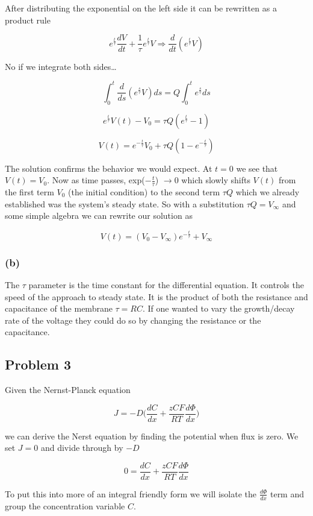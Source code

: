\documentclass[letterpaper,10pt,english]{/usr/share/sphinx/texinputs/sphinxhowto}
\begin{document}
After distributing the exponential on the left side it can be rewritten
as a product rule

\[e^{\frac{t}{\tau}}\frac{dV}{dt}+\frac{1}{\tau}e^{\frac{t}{\tau}}V \Rightarrow \frac{d}{dt}(e^{\frac{t}{\tau}}V)\]

No if we integrate both sides\ldots{}

\[\int_0^t \frac{d}{ds}(e^{\frac{s}{\tau}}V) ds = Q \int_0^t e^{\frac{s}{\tau}}ds\]

\[e^{\frac{t}{\tau}}V(t)-V_0 = \tau Q (e^{\frac{t}{\tau}}-1)\]

\[V(t)= e^{-\frac{t}{\tau}}V_0+\tau Q(1-e^{-\frac{t}{\tau}})\]

The solution confirms the behavior we would expect. At $t=0$ we see that
$V(t)=V_0$. Now as time passes, exp($-\frac{t}{\tau}$) $\rightarrow 0$
which slowly shifts $V(t)$ from the first term $V_0$ (the initial
condition) to the second term $\tau Q$ which we already established was
the system's steady state. So with a substitution $\tau Q=V_{\infty}$
and some simple algebra we can rewrite our solution as

\[V(t) = (V_0-V_{\infty})e^{-\frac{t}{\tau}}+V_{\infty}\]

\subsubsection{(b)}\label{b}

The $\tau$ parameter is the time constant for the differential equation.
It controls the speed of the approach to steady state. It is the product
of both the resistance and capacitance of the membrane $\tau=RC$. If one
wanted to vary the growth/decay rate of the voltage they could do so by
changing the resistance or the capacitance.\subsection{Problem 3}\label{problem-3}

Given the Nernst-Planck equation

\[J = -D\Big(\frac{dC}{dx}+\frac{zCF}{RT}\frac{d\Phi}{dx}\Big)\]

we can derive the Nerst equation by finding the potential when flux is
zero. We set $J=0$ and divide through by $-D$

\[0=\frac{dC}{dx}+\frac{zCF}{RT}\frac{d\Phi}{dx}\]

To put this into more of an integral friendly form we will isolate the
$\frac{d\Phi}{dx}$ term and group the concentration variable $C$.
\end{document}
